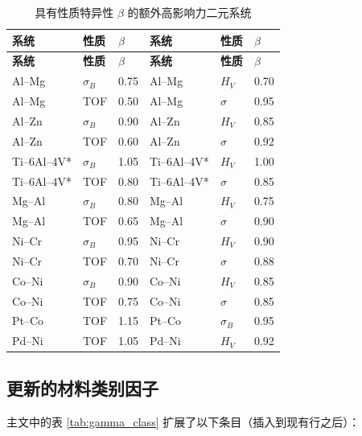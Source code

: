 \documentclass[12pt,a4paper]{article}
\begin{document}
	\begin{longtable}{p{2.2cm} p{2.2cm} p{1.2cm} p{2.2cm} p{2.2cm} p{1.2cm}}
		\caption{具有性质特异性 $\beta$ 的额外高影响力二元系统}\label{tab:beta_additional}\\
		\toprule
		\textbf{系统} & \textbf{性质} & $\beta$ & \textbf{系统} & \textbf{性质} & $\beta$ \\
		\midrule
		\endfirsthead
		\toprule
		\textbf{系统} & \textbf{性质} & $\beta$ & \textbf{系统} & \textbf{性质} & $\beta$ \\
		\midrule
		\endhead
		Al–Mg & $\sigma_B$ & 0.75 & Al–Mg & $H_V$ & 0.70 \\
		Al–Mg & TOF & 0.50 & Al–Mg & $\sigma$ & 0.95 \\
		Al–Zn & $\sigma_B$ & 0.90 & Al–Zn & $H_V$ & 0.85 \\
		Al–Zn & TOF & 0.60 & Al–Zn & $\sigma$ & 0.92 \\
		Ti–6Al–4V* & $\sigma_B$ & 1.05 & Ti–6Al–4V* & $H_V$ & 1.00 \\
		Ti–6Al–4V* & TOF & 0.80 & Ti–6Al–4V* & $\sigma$ & 0.85 \\
		Mg–Al & $\sigma_B$ & 0.80 & Mg–Al & $H_V$ & 0.75 \\
		Mg–Al & TOF & 0.65 & Mg–Al & $\sigma$ & 0.90 \\
		Ni–Cr & $\sigma_B$ & 0.95 & Ni–Cr & $H_V$ & 0.90 \\
		Ni–Cr & TOF & 0.70 & Ni–Cr & $\sigma$ & 0.88 \\
		Co–Ni & $\sigma_B$ & 0.90 & Co–Ni & $H_V$ & 0.85 \\
		Co–Ni & TOF & 0.75 & Co–Ni & $\sigma$ & 0.85 \\
		Pt–Co & TOF & 1.15 & Pt–Co & $\sigma_B$ & 0.95 \\
		Pd–Ni & TOF & 1.05 & Pd–Ni & $H_V$ & 0.92 \\
		\bottomrule
	\end{longtable}
	\vspace{0.2cm}
	
	\subsection*{更新的材料类别因子}
	主文中的表 \ref{tab:gamma_class} 扩展了以下条目（插入到现有行之后）：
	
\end{document}
